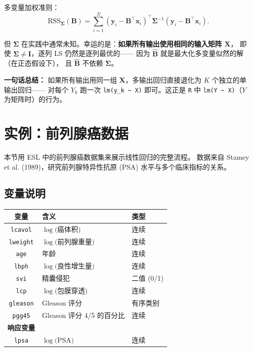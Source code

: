 多变量加权准则：
\begin{equation}\label{eq:multi_weighted}
    \mathrm{RSS}_{\bm{\Sigma}}(\mathbf{B})
    = \sum_{i=1}^{N} (\mathbf{y}_i - \mathbf{B}^\top \mathbf{x}_i)^\top \bm{\Sigma}^{-1}
      (\mathbf{y}_i - \mathbf{B}^\top \mathbf{x}_i).
\end{equation}

但 $\bm{\Sigma}$ 在实践中通常未知。幸运的是：\textbf{如果所有输出使用相同的输入矩阵 $\mathbf{X}$}，
即使 $\bm{\Sigma} \neq \mathbf{I}$，逐列 LS 仍然是逐列最优的——
因为 $\hat{\mathbf{B}}$ 就是最大化多变量似然的解（在正态假设下），
且 $\hat{\mathbf{B}}$ 不依赖 $\bm{\Sigma}$。

\textbf{一句话总结：} 如果所有输出用同一组 $\mathbf{X}$，多输出回归直接退化为 $K$ 个独立的单输出回归——
对每个 $Y_k$ 跑一次 \texttt{lm(y\_k \textasciitilde\ X)} 即可。这正是 \texttt{R} 中 \texttt{lm(Y \textasciitilde\ X)}（$Y$ 为矩阵时）的行为。

\section{实例：前列腺癌数据}

本节用 ESL 中的前列腺癌数据集来展示线性回归的完整流程。
数据来自 Stamey et al. (1989)，研究前列腺特异性抗原 (PSA) 水平与多个临床指标的关系。

\subsection{变量说明}

\begin{center}
\renewcommand{\arraystretch}{1.3}
\begin{tabular}{c|l|l}
\toprule
\textbf{变量} & \textbf{含义} & \textbf{类型} \\
\midrule
\texttt{lcavol}   & $\log($癌体积$)$        & 连续 \\
\texttt{lweight}  & $\log($前列腺重量$)$    & 连续 \\
\texttt{age}      & 年龄                    & 连续 \\
\texttt{lbph}     & $\log($良性增生量$)$    & 连续 \\
\texttt{svi}      & 精囊侵犯                & 二值 (0/1) \\
\texttt{lcp}      & $\log($包膜穿透$)$      & 连续 \\
\texttt{gleason}  & Gleason 评分            & 有序类别 \\
\texttt{pgg45}    & Gleason 评分 4/5 的百分比 & 连续 \\
\midrule
\textbf{响应变量} & & \\
\texttt{lpsa}     & $\log($PSA$)$           & 连续 \\
\bottomrule
\end{tabular}
\end{center}

